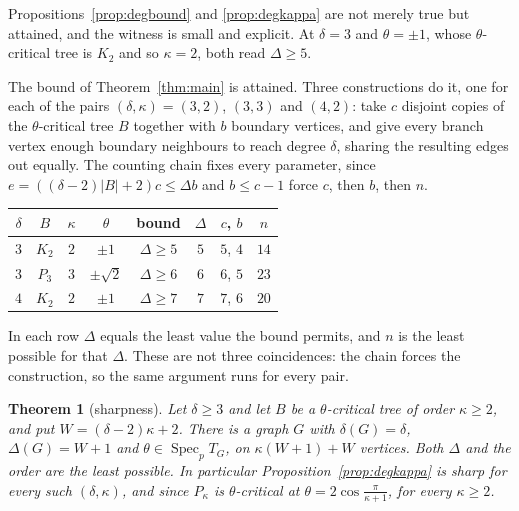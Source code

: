 \documentclass[11pt]{article}
\newtheorem{theorem}{Theorem}
\theoremstyle{remark}
\begin{document}
Propositions~\ref{prop:degbound} and \ref{prop:degkappa} are not merely true but attained, and the
witness is small and explicit. At $\delta=3$ and $\theta=\pm1$, whose $\theta$-critical tree is
$K_2$ and so $\kappa=2$, both read $\Delta\ge5$.

The bound of Theorem~\ref{thm:main} is attained. Three constructions do it, one for each of the
pairs $(\delta,\kappa)=(3,2)$, $(3,3)$ and $(4,2)$: take $c$ disjoint copies of the $\theta$-critical
tree $B$ together with $b$ boundary vertices, and give every branch vertex enough boundary
neighbours to reach degree $\delta$, sharing the resulting edges out equally. The counting chain
fixes every parameter, since $e=((\delta-2)|B|+2)c\le\Delta b$ and $b\le c-1$ force $c$, then $b$,
then $n$.

\begin{center}
\begin{tabular}{cccccccc}
\hline
$\delta$ & $B$ & $\kappa$ & $\theta$ & bound & $\Delta$ & $c$, $b$ & $n$ \\
\hline
$3$ & $K_2$ & $2$ & $\pm1$ & $\Delta\ge5$ & $5$ & $5$, $4$ & $14$ \\
$3$ & $P_3$ & $3$ & $\pm\sqrt2$ & $\Delta\ge6$ & $6$ & $6$, $5$ & $23$ \\
$4$ & $K_2$ & $2$ & $\pm1$ & $\Delta\ge7$ & $7$ & $7$, $6$ & $20$ \\
\hline
\end{tabular}
\end{center}

In each row $\Delta$ equals the least value the bound permits, and $n$ is the least possible for
that $\Delta$. These are not three coincidences: the chain forces the construction, so the same
argument runs for every pair.

\begin{theorem}[sharpness]\label{thm:sharpgen}
Let $\delta\ge3$ and let $B$ be a $\theta$-critical tree of order $\kappa\ge2$, and put
$W=(\delta-2)\kappa+2$. There is a graph $G$ with $\delta(G)=\delta$, $\Delta(G)=W+1$ and
$\theta\in\operatorname{Spec}_p T_G$, on $\kappa(W+1)+W$ vertices. Both $\Delta$ and the order are
the least possible. In particular Proposition~\ref{prop:degkappa} is sharp for every such
$(\delta,\kappa)$, and since $P_\kappa$ is $\theta$-critical at
$\theta=2\cos\frac{\pi}{\kappa+1}$, for every $\kappa\ge2$.
\end{theorem}
\end{document}
